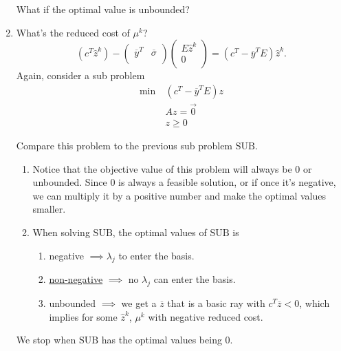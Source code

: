 \begin{prev}
\begin{enumerate}
		      \begin{problem}
		      What if the optimal value is unbounded?
		      \end{problem}
		\item What's the reduced cost of \(\mu^k\)?
		      \[
			      (c^{T}\hat{z}^k) - \begin{pmatrix}
				      \overline{y}^{T} & \overline{\sigma} \\
			      \end{pmatrix}\begin{pmatrix}
				      E \hat{z}^k \\
				      0           \\
			      \end{pmatrix} =  (c^{T} - \overline{y}^{T}E)\hat{z}^k.
		      \]
		      Again, consider a sub problem
		      \begin{align*}
			      \min~ & (c^{T} - \overline{y}^{T}E)z \\
			            & Az = \vec{0}                 \\
			            & z\geq 0
		      \end{align*}

		      \begin{remark}
			      Compare this problem to the previous sub problem \(\mathrm{SUB}\).
			      \begin{enumerate}
				      \item Notice that the objective value of this problem will always be \(0\) or unbounded. Since \(0\) is always a feasible solution, or
				            if once it's negative, we can multiply it by a positive number and make the optimal values smaller.
				      \item When solving \(\mathrm{SUB}\), the optimal values of \(\mathrm{SUB}\) is
				            \begin{enumerate}
					            \item negative \(\implies \lambda_{j}\) to enter the basis.
					            \item \underline{non-negative} \(\implies\) no \(\lambda_{j}\) can enter the basis.
					            \item unbounded \(\implies\) we get a \(\overline{z}\) that is a basic ray with \(c^{T}\overline{z} <0\), which implies for some \(\hat{z}^k\), \(\mu^k\) with negative reduced cost.
				            \end{enumerate}
			      \end{enumerate}
			      \begin{note}
				      We stop when \(\mathrm{SUB}\) has the optimal values being \(0\).
			      \end{note}
		      \end{remark}
	\end{enumerate}
\end{prev}

